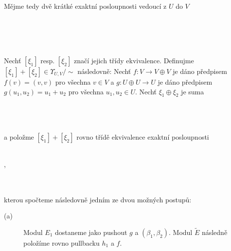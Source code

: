 \begin{dfn}
         Mějme tedy dvě krátké exaktní posloupnosti vedoucí z $U$ do $V$\\\\
           \centerline{} \\\\\\
         Nechť $[\xi_1]$ resp. $[\xi_2]$ značí jejich třídy ekvivalence. Definujme 
         $[\xi_1]+[\xi_2]\in \Upsilon_{U,V}/\sim$
         následovně: Nechť $f:V\to V\oplus V$ je dáno předpisem $f(v)=(v,v)$ pro všechna 
         $v\in V$ a $g:U \oplus U\to U$ je dáno předpisem $g(u_1,u_2)=u_1+u_2$ 
         pro všechna $u_1,u_2\in U$. Nechť $\xi_1\oplus\xi_2$ je suma \\\\
           \centerline{} \\\\
        a položme $[\xi_1]+[\xi_2]$ rovno třídě ekvivalence exaktní posloupnosti\\\\
           \centerline{,} \\\\
           kterou spočteme následovně jedním ze dvou možných postupů: 
           \begin{description}
             \item[(a)]
               Modul $E_1$ dostaneme jako pushout $g$ a $(\beta_1,\beta_2)$. 
               Modul $\tilde E$ následně položíme rovno pullbacku $h_1$ a $f$. \\\\             
               \centerline{}
\end{description}
\end{dfn}
